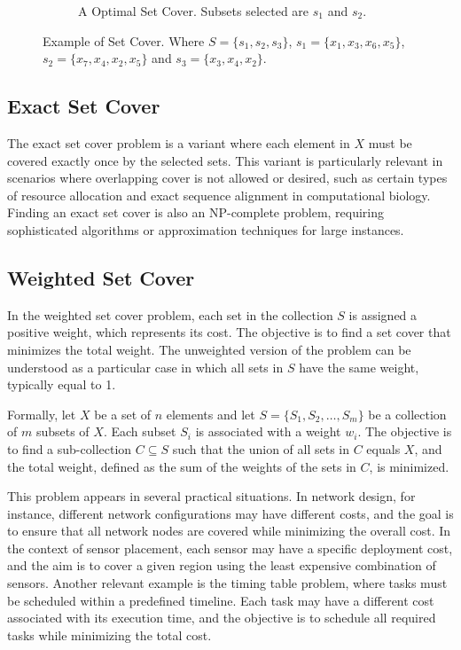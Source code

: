 \begin{figure}[!ht]
\begin{subfigure}{0.45\textwidth}
{\begin{circuitikz}
            \end{circuitikz}
            }%
            \caption{A Optimal Set Cover. Subsets selected are $s_1$ and $s_2$.} 
            \label{fig:set_cover_2}
        \end{subfigure}
        \caption[Examples of Set Cover]{Example of Set Cover. Where $S=\{s_1, s_2, s_3\}$, $s_1=\{x_1, x_3, x_6, x_5\}$, $s_2=\{x_7, x_4, x_2, x_5\}$ and $s_3=\{x_3, x_4, x_2\}$.} 
        \label{fig:set_cover}
    \end{figure}


    \subsection{Exact Set Cover}
    The exact set cover problem is a variant where each element in $X$ must be covered exactly once by the selected sets. This variant is particularly relevant in scenarios where overlapping cover is not allowed or desired, such as certain types of resource allocation and exact sequence alignment in computational biology. Finding an exact set cover is also an NP-complete problem, requiring sophisticated algorithms or approximation techniques for large instances.
    
    \subsection{Weighted Set Cover}

        In the weighted set cover problem, each set in the collection $S$ is assigned a positive weight, which represents its cost. The objective is to find a set cover that minimizes the total weight. The unweighted version of the problem can be understood as a particular case in which all sets in $S$ have the same weight, typically equal to 1.

        Formally, let $X$ be a set of $n$ elements and let $S = \{S_1, S_2, \ldots, S_m\}$ be a collection of $m$ subsets of $X$. Each subset $S_i$ is associated with a weight $w_i$. The objective is to find a sub-collection $C \subseteq S$ such that the union of all sets in $C$ equals $X$, and the total weight, defined as the sum of the weights of the sets in $C$, is minimized.

        This problem appears in several practical situations. In network design, for instance, different network configurations may have different costs, and the goal is to ensure that all network nodes are covered while minimizing the overall cost. In the context of sensor placement, each sensor may have a specific deployment cost, and the aim is to cover a given region using the least expensive combination of sensors. Another relevant example is the timing table problem, where tasks must be scheduled within a predefined timeline. Each task may have a different cost associated with its execution time, and the objective is to schedule all required tasks while minimizing the total cost.

